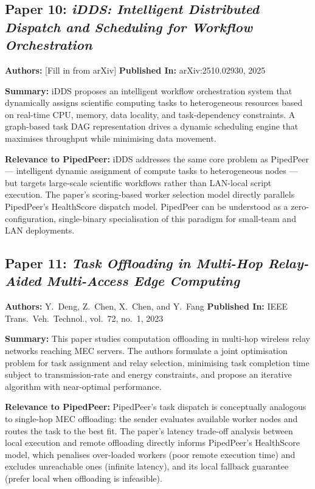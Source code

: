 \subsection*{Paper 10: \textit{iDDS: Intelligent Distributed Dispatch and Scheduling
for Workflow Orchestration}}
\textbf{Authors:} [Fill in from arXiv] \quad
\textbf{Published In:} arXiv:2510.02930, 2025~\cite{author2025idds}

\noindent\textbf{Summary:}
iDDS proposes an intelligent workflow orchestration system that dynamically assigns
scientific computing tasks to heterogeneous resources based on real-time CPU,
memory, data locality, and task-dependency constraints. A graph-based task DAG
representation drives a dynamic scheduling engine that maximises throughput while
minimising data movement.

\noindent\textbf{Relevance to PipedPeer:}
iDDS addresses the same core problem as PipedPeer — intelligent dynamic assignment
of compute tasks to heterogeneous nodes — but targets large-scale scientific
workflows rather than LAN-local script execution. The paper's scoring-based worker
selection model directly parallels PipedPeer's HealthScore dispatch model.
PipedPeer can be understood as a zero-configuration, single-binary specialisation
of this paradigm for small-team and LAN deployments.

\subsection*{Paper 11: \textit{Task Offloading in Multi-Hop Relay-Aided Multi-Access
Edge Computing}}
\textbf{Authors:} Y.~Deng, Z.~Chen, X.~Chen, and Y.~Fang \quad
\textbf{Published In:} IEEE Trans.\ Veh.\ Technol., vol.~72, no.~1, 2023~\cite{deng2023}

\noindent\textbf{Summary:}
This paper studies computation offloading in multi-hop wireless relay networks
reaching MEC servers. The authors formulate a joint optimisation problem for task
assignment and relay selection, minimising task completion time subject to
transmission-rate and energy constraints, and propose an iterative algorithm with
near-optimal performance.

\noindent\textbf{Relevance to PipedPeer:}
PipedPeer's task dispatch is conceptually analogous to single-hop MEC offloading:
the sender evaluates available worker nodes and routes the task to the best fit.
The paper's latency trade-off analysis between local execution and remote offloading
directly informs PipedPeer's HealthScore model, which penalises over-loaded workers
(poor remote execution time) and excludes unreachable ones (infinite latency),
and its local fallback guarantee (prefer local when offloading is infeasible).

